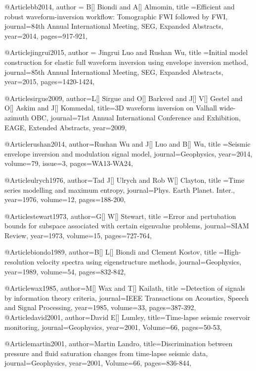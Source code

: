 @Article{bb2014,
  author = {B[] Biondi and A[] Almomin},
  title ={Efficient and robust waveform-inversion workflow: Tomographic FWI followed by FWI},
  journal={84th Annual International Meeting, SEG, Expanded Abstracts},
  year=2014,
  pages={917-921},
}

@Article{jingrui2015,
  author = {Jingrui Luo and Rushan Wu},
  title ={Initial model construction for elastic full waveform inversion using envelope inversion method},
  journal={85th Annual International Meeting, SEG, Expanded Abstracts},
  year=2015,
  pages={1420-1424},
}

@Article{sirgue2009,
  author={L[] Sirgue and O[] Barkved and J[] V[] Gestel and O[] Askim and J[] Kommedal},
  title={3{D} waveform inversion on Valhall wide-azimuth {OBC}},
  journal={71st Annual International Conference and Exhibition, EAGE, Extended Abstracts},
  year=2009,
}

@Article{rushan2014,
  author={Rushan Wu and J[] Luo and B[] Wu},
  title ={Seismic envelope inversion and modulation signal model},
  journal={Geophysics},
  year=2014,
  volume=79,
  issue=3,
  pages={WA13-WA24},
}



@Article{ulrych1976,
  author={Tad J[] Ulrych and Rob W[] Clayton},
  title ={Time series modelling and maximum entropy},
  journal={Phys. Earth Planet. Inter.},
  year=1976,
  volume=12,
  pages={188-200},
}

@Article{stewart1973,
  author={G[] W[] Stewart},
  title ={Error and pertubation bounds for subspace associated with certain eigenvalue problems},
  journal={SIAM Review},
  year=1973,
  volume=15,
  pages={727-764},
}

@Article{biondo1989,
  author={B[] L[] Biondi and Clement Kostov},
  title ={High-resolution velocity spectra using eigenstructure methods},
  journal={Geophysics},
  year=1989,
  volume=54,
  pages={832-842},
}

@Article{wax1985,
  author={M[] Wax and T[] Kailath},
  title ={Detection of signals by information theory criteria},
  journal={IEEE Transactions on Acoustics, Speech and Signal Processing},
  year=1985,
  volume=33,
  pages={387-392},
}
@Article{david2001,
  author={David E[] Lumley},
  title={Time-lapse seismic reservoir monitoring},
  journal={Geophysics},
  year=2001,
  Volume=66,
  pages={50-53},
}

@Article{martin2001,
  author={Martin Landro},
  title={Discrimination between pressure and fluid saturation changes from time‐lapse seismic data},
  journal={Geophysics},
  year=2001,
  Volume=66,
  pages={836-844},
}

